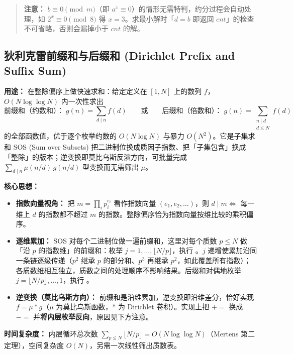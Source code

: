 \begin{quote}
\textbf{注意：} $b \equiv 0 \pmod m$（即 $a^{x} \equiv 0$）的情形无需特判，约分过程会自动处理，如 $2^{x} \equiv 0 \pmod 8$ 得 $x = 3$。求最小解时「$d = b$ 即返回 $cnt$」的检查不可省略，否则会漏掉小于 $cnt$ 的解。
\end{quote}

\subsection{狄利克雷前缀和与后缀和 (Dirichlet Prefix and Suffix Sum)}

\textbf{用途：}
在整除偏序上做快速求和：给定定义在 $[1, N]$ 上的数列 $f$，$O(N\log\log N)$ 内一次性求出
\[ \text{前缀和（约数和）：}\; g(n)=\sum_{d\mid n}f(d) \qquad\text{或}\qquad \text{后缀和（倍数和）：}\; g(n)=\sum_{\substack{n\mid d\\ d\le N}}f(d) \]
的全部函数值，优于逐个枚举约数的 $O(N\log N)$ 与暴力 $O(N^2)$。它是子集求和 SOS (Sum over Subsets) 把二进制位换成质因子指数、把「子集包含」换成「整除」的版本；逆变换即莫比乌斯反演方向，可批量完成 $\sum_{d\mid n}\mu(n/d)\,g(n/d)$ 型变换而无需筛出 $\mu$。

\textbf{核心思想：}
\begin{itemize}
    \item \textbf{指数向量视角：} 把 $m=\prod_i p_i^{e_i}$ 看作指数向量 $(e_1,e_2,\dots)$，则 $d\mid m\iff$ 每一维上 $d$ 的指数都不超过 $m$ 的指数。整除偏序恰为指数向量按维比较的乘积偏序。
    \item \textbf{逐维累加：} SOS 对每个二进制位做一遍前缀和，这里对每个质数 $p\le N$ 做「沿 $p$ 的指数维」的前缀和：枚举 $j=1,\dots,\lfloor N/p\rfloor$，执行 。$j$ 递增使累加沿同一条链逐级传递（$p^2$ 继承 $p$ 的部分和、$p^3$ 再继承 $p^2$，如此覆盖所有指数）；各质数维相互独立，质数之间的处理顺序不影响结果。后缀和对偶地枚举 $j=\lfloor N/p\rfloor,\dots,1$，执行 。
    \item \textbf{逆变换（莫比乌斯方向）：} 前缀和是沿维累加，逆变换即沿维差分，恰好实现 $f=\mu*g$（$\mu$ 为莫比乌斯函数，$*$ 为 Dirichlet 卷积）。实现上把 $+=$ 换成 $-=$ 并\textbf{将内层枚举反向}，原因见下方注意。
\end{itemize}

\textbf{时间复杂度：} 内层循环总次数 $\sum_{p\le N}\lfloor N/p\rfloor=O(N\log\log N)$（Mertens 第二定理），空间复杂度 $O(N)$，另需一次线性筛出质数表。



